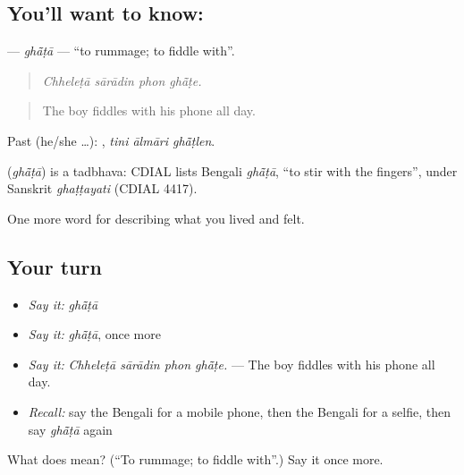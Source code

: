 \subsection*{You'll want to know: }
\textbf{} — \emph{ghā̃ṭā} — \textquotedblleft{}to rummage; to fiddle with\textquotedblright{}.

\begin{quote}
   
\end{quote}

\begin{quote}
\emph{Chheleṭā sārādin phon ghā̃ṭe.}
\end{quote}

\begin{quote}
The boy fiddles with his phone all day.
\end{quote}

Past (he/she …):   , \emph{tini ālmāri ghā̃ṭlen}.

\begin{cousinweb}
\textbf{} (\emph{ghā̃ṭā}) is a tadbhava: CDIAL lists Bengali \emph{ghā̃ṭā}, \textquotedblleft{}to stir with the fingers\textquotedblright{}, under Sanskrit \emph{ghaṭṭayati} (CDIAL 4417).
\end{cousinweb}

\begin{grammarlens}[title={What you've built}]
One more word for describing what you lived and felt.
\end{grammarlens}

\subsection*{Your turn}
\begin{itemize}
\raggedright
  \item \emph{Say it:} \emph{ghā̃ṭā}
  \item \emph{Say it:} \emph{ghā̃ṭā}, once more
  \item \emph{Say it:} \emph{Chheleṭā sārādin phon ghā̃ṭe.} — The boy fiddles with his phone all day.
  \item \emph{Recall:} say the Bengali for a mobile phone, then the Bengali for a selfie, then say \emph{ghā̃ṭā} again
\end{itemize}

\begin{tcolorbox}[breakable,colback=teal!4,colframe=teal!35!black,title={Before you move on}]
What does  mean? (\textquotedblleft{}To rummage; to fiddle with\textquotedblright{}.) Say it once more.
\end{tcolorbox}

